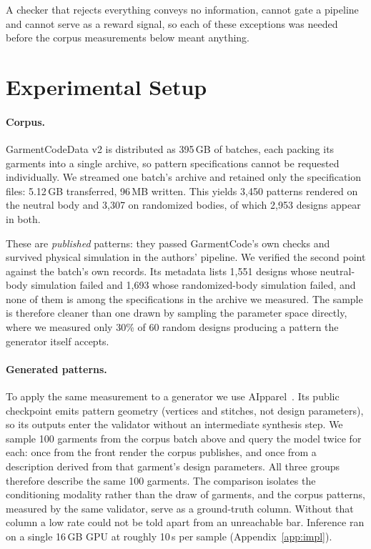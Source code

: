 \documentclass[10pt,twocolumn]{article}
\begin{document}
A checker that rejects everything conveys no information, cannot gate a
pipeline and cannot serve as a reward signal, so each of these exceptions was
needed before the corpus measurements below meant anything.

\section{Experimental Setup}
\label{sec:setup}

\paragraph{Corpus.} GarmentCodeData v2 is distributed as 395\,GB of batches,
each packing its garments into a single archive, so pattern specifications
cannot be requested individually. We streamed one batch's archive and retained
only the specification files: 5.12\,GB transferred, 96\,MB written. This yields
3{,}450 patterns rendered on the neutral body and 3{,}307 on randomized bodies,
of which 2{,}953 designs appear in both.

These are \emph{published} patterns: they passed GarmentCode's own checks and
survived physical simulation in the authors' pipeline. We verified the second
point against the batch's own records. Its metadata lists 1{,}551 designs whose
neutral-body simulation failed and 1{,}693 whose randomized-body simulation
failed, and none of them is among the specifications in the archive we
measured.
The sample is therefore
cleaner than one drawn by sampling the parameter space directly, where we
measured only 30\% of 60 random designs producing a pattern the generator
itself accepts.

\paragraph{Generated patterns.} To apply the same measurement to a generator we
use AIpparel~\citep{aipparel}. Its public checkpoint emits pattern geometry
(vertices and stitches, not design parameters), so its outputs enter the
validator without an intermediate synthesis step. We sample 100 garments from
the corpus batch above and query the model twice for each: once from the front
render the corpus publishes, and once from a description derived from that
garment's design parameters. All three groups therefore describe the same 100
garments. The comparison isolates the conditioning modality rather than the
draw of garments, and the corpus patterns, measured by the same validator,
serve as a ground-truth column. Without that column a low rate could not be
told apart from an unreachable bar. Inference ran on a single 16\,GB GPU at
roughly 10\,s per sample (Appendix~\ref{app:impl}).
\end{document}
